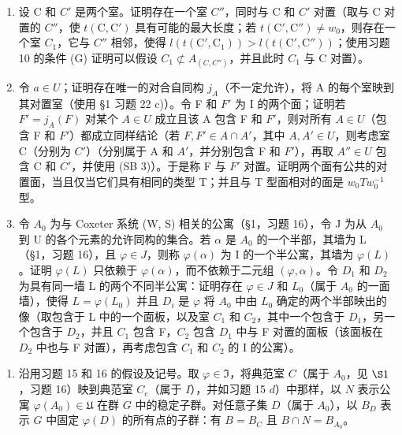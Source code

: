 \begin{enumerate}
\def\labelenumi{\alph{enumi})}
\item
  设 C 和 \(C'\) 是两个室。证明存在一个室 \(C''\)，同时与 C 和 \(C'\) 对置（取与 C 对置的 \(C''\)，使 \(t(\mathrm{C},\mathrm{C}')\) 具有可能的最大长度；若 \(t(\mathrm{C}',\mathrm{C}'')\neq w_{0}\)，则存在一个室 \(C_{1}\)，它与 \(C''\) 相邻，使得 \(l(t(\mathrm{C}',\mathrm{C}_{1}))>l(t(\mathrm{C}',\mathrm{C}''))\)；使用习题 10 的条件 (G) 证明可以假设 \(C_{1}\not\subset A_{(C,C'')}\)，并且此时 \(C_{1}\) 与 C 对置）。
\item
  令 \(a \in U\)；证明存在唯一的对合自同构 \(j_{A}\)（不一定允许），将 A 的每个室映到其对置室（使用 §1 习题 22 c)）。令 F 和 \(F'\) 为 I 的两个面；证明若 \(F' = j_{A}(F)\) 对某个 \(A \in U\) 成立且该 A 包含 F 和 \(F'\)，则对所有 \(A \in U\)（包含 F 和 \(F'\)）都成立同样结论（若 \(F, F' \in A \cap A'\)，其中 \(A, A' \in U\)，则考虑室 C（分别为 \(C'\)）（分别属于 A 和 \(A'\)，并分别包含 F 和 \(F'\)），再取 \(A'' \in U\) 包含 C 和 \(C'\)，并使用 (SB 3)）。于是称 F 与 \(F'\) 对置。证明两个面有公共的对置面，当且仅当它们具有相同的类型 T；并且与 T 型面相对的面是 \(w_{0}Tw_{0}^{-1}\) 型。
\item
  令 \(A_{0}\) 为与 Coxeter 系统 (W, S) 相关的公寓（§1，习题 16），令 J 为从 \(A_{0}\) 到 U 的各个元素的允许同构的集合。若 \(\alpha\) 是 \(A_{0}\) 的一个半部，其墙为 L（§1，习题 16），且 \(\varphi \in J\)，则称 \(\varphi(\alpha)\) 为 I 的一个半公寓，其墙为 \(\varphi(L)\)。证明 \(\varphi(L)\) 只依赖于 \(\varphi(\alpha)\)，而不依赖于二元组 \((\varphi, \alpha)\)。令 \(D_{1}\) 和 \(D_{2}\) 为具有同一墙 L 的两个不同半公寓：证明存在 \(\varphi \in J\) 和 \(L_{0}\)（属于 \(A_{0}\) 的一面墙），使得 \(L = \varphi(L_{0})\) 并且 \(D_{i}\) 是 \(\varphi\) 将 \(A_{0}\) 中由 \(L_{0}\) 确定的两个半部映出的像（取包含于 L 中的一个面板，以及室 \(C_{1}\) 和 \(C_{2}\)，其中一个包含于 \(D_{1}\)，另一个包含于 \(D_{2}\)，并且 \(C_{1}\) 包含 F，\(C_{2}\) 包含 \(D_{1}\) 中与 F 对置的面板（该面板在 \(D_{2}\) 中也与 F 对置），再考虑包含 \(C_{1}\) 和 \(C_{2}\) 的 I 的公寓）。
\end{enumerate}

\begin{enumerate}
\def\labelenumi{\arabic{enumi})}
\setcounter{enumi}{16}
\tightlist
\item
  沿用习题 15 和 16 的假设及记号。取 \(\varphi \in \mathfrak{I}\)，将典范室 \(C\)（属于 \(A_0\)，见 \(\S 1\)，习题 16）映到典范室 \(C_e\)（属于 \(I\)），并如习题 15 \(d\)）中那样，以 \(N\) 表示公寓 \(\varphi(A_0) \in \mathfrak{U}\) 在群 \(G\) 中的稳定子群。对任意子集 \(D\)（属于 \(A_0\)），以 \(B_D\) 表示 \(G\) 中固定 \(\varphi(D)\) 的所有点的子群：有 \(B = B_C\) 且 \(B \cap N = B_{A_0}\)。
\end{enumerate}

